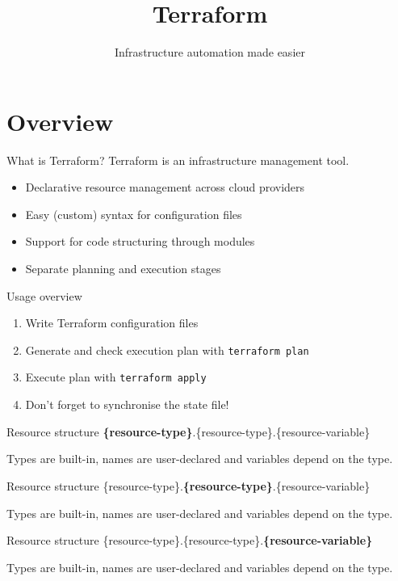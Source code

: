 \documentclass[12pt]{beamer}
\title{Terraform}
\subtitle{Infrastructure automation made easier}
\begin{document}

\maketitle

\section{Overview}

\begin{frame}{What is Terraform?}
  Terraform is an infrastructure management tool.
  \begin{itemize}
  \item Declarative resource management across cloud providers
  \item Easy (custom) syntax for configuration files
  \item Support for code structuring through modules
  \item Separate planning and execution stages
  \end{itemize}
\end{frame}

\begin{frame}{Usage overview}
  \begin{enumerate}
  \item Write Terraform configuration files
  \item Generate and check execution plan with \texttt{terraform plan}
  \item Execute plan with \texttt{terraform apply}
  \item Don't forget to synchronise the state file!
  \end{enumerate}
\end{frame}

\begin{frame}{Resource structure}
  \textbf{\{resource-type\}}.\{resource-type\}.\{resource-variable\}

  Types are built-in, names are user-declared and variables depend on the type.
\end{frame}

\begin{frame}{Resource structure}
  \{resource-type\}.\textbf{\{resource-type\}}.\{resource-variable\}

  Types are built-in, names are user-declared and variables depend on the type.
\end{frame}

\begin{frame}{Resource structure}
  \{resource-type\}.\{resource-type\}.\textbf{\{resource-variable\}}

  Types are built-in, names are user-declared and variables depend on the type.
\end{frame}
\end{document}
